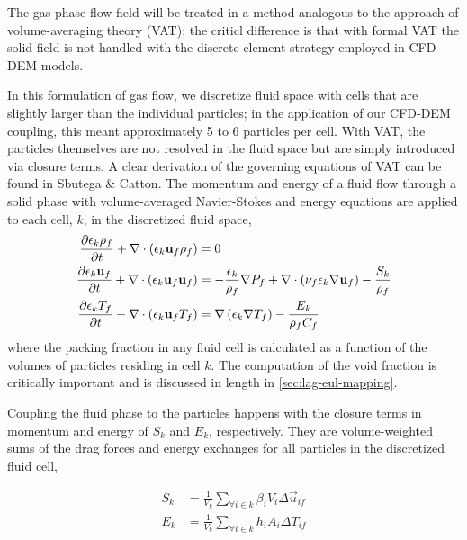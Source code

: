 The gas phase flow field will be treated in a method analogous to the approach of volume-averaging theory (VAT); the criticl difference is that with formal VAT the solid field is not handled with the discrete element strategy employed in CFD-DEM models.\cite{Tsuji1992} 

In this formulation of gas flow, we discretize fluid space with cells that are slightly larger than the individual particles; in the application of our CFD-DEM coupling, this meant approximately 5 to 6 particles per cell. With VAT, the particles themselves are not resolved in the fluid space but are simply introduced via closure terms.\cite{Sbutega2013,Horvat2006} A clear derivation of the governing equations of VAT can be found in Sbutega \& Catton\cite{Sbutega2013}. The momentum and energy of a fluid flow through a solid phase with volume-averaged Navier-Stokes and energy equations are applied to each cell, $k$, in the discretized fluid space,
\begin{subequations}\label{eq:cfd-equations}
\begin{align}
\pder[\epsilon_k \rho_f]{t} + \nabla\cdot(\epsilon_k \vec{u}_f \rho_f) &= 0\\
\pder[\epsilon_k \vec{u}_f]{t} + \nabla\cdot(\epsilon_k \vec{u}_f \vec{u}_f) &= -\frac{\epsilon_k}{\rho_f}\nabla P_f + \nabla\cdot\left(\nu_f\epsilon_k\nabla \vec{u}_f\right) - \frac{S_k}{\rho_f}\\
\pder[\epsilon_k T_f]{t} + \nabla\cdot(\epsilon_k \vec{u}_f T_f) &= \nabla\left(\epsilon_k\nabla T_f\right)-\frac{E_k}{\rho_fC_f}
\end{align}
\end{subequations}
where the packing fraction in any fluid cell is calculated as a function of the volumes of particles residing in cell $k$. The computation of the void fraction is critically important and is discussed in length in \cref{sec:lag-eul-mapping}.

Coupling the fluid phase to the particles happens with the closure terms in momentum and energy of $S_k$ and $E_k$, respectively. They are volume-weighted sums of the drag forces and energy exchanges for all particles in the discretized fluid cell,

\begin{subequations}\label{eq:cfd-sources}
\begin{align}
	S_k &= \frac{1}{V_k}\sum_{\forall i \in k} \beta_i V_i \Delta \vec{u}_{if} \label{eq:cfd-mom-source}\\
	E_k &= \frac{1}{V_k}\sum_{\forall i \in k} h_i A_i \Delta T_{if}
\end{align}
\end{subequations}

